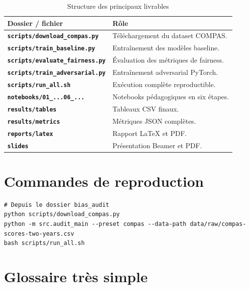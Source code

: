 \documentclass[12pt,a4paper]{report}
\begin{document}
\begin{table}[H]
\centering
\caption{Structure des principaux livrables}
\begin{tabularx}{\textwidth}{>{\bfseries}l X}
\toprule
Dossier / fichier & Rôle \\
\midrule
\texttt{scripts/download\_compas.py} & Téléchargement du dataset COMPAS. \\
\texttt{scripts/train\_baseline.py} & Entraînement des modèles baseline. \\
\texttt{scripts/evaluate\_fairness.py} & Évaluation des métriques de fairness. \\
\texttt{scripts/train\_adversarial.py} & Entraînement adversarial PyTorch. \\
\texttt{scripts/run\_all.sh} & Exécution complète reproductible. \\
\texttt{notebooks/01\_...06\_...} & Notebooks pédagogiques en six étapes. \\
\texttt{results/tables} & Tableaux CSV finaux. \\
\texttt{results/metrics} & Métriques JSON complètes. \\
\texttt{reports/latex} & Rapport LaTeX et PDF. \\
\texttt{slides} & Présentation Beamer et PDF. \\
\bottomrule
\end{tabularx}
\end{table}

\section{Commandes de reproduction}

\begin{tcolorbox}[codebox]
\begin{lstlisting}[style=pythonstyle]
# Depuis le dossier bias_audit
python scripts/download_compas.py
python -m src.audit_main --preset compas --data-path data/raw/compas-scores-two-years.csv
bash scripts/run_all.sh
\end{lstlisting}
\end{tcolorbox}

\section{Glossaire très simple}
\end{document}
